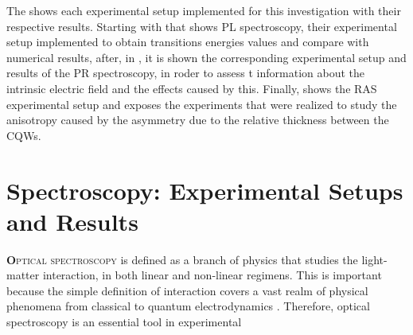 The  shows each experimental setup implemented for this investigation with
their respective results. Starting with   that shows \gls{PL} spectroscopy, their
experimental setup implemented to obtain transitions energies values and compare with
numerical results, after, in , it is shown the corresponding experimental setup and results of the \gls{PR} spectroscopy, in roder to assess t information about the intrinsic electric field and the effects caused by this. Finally,  shows the \gls{RAS} experimental setup and exposes the experiments
that were realized to study the anisotropy caused by the asymmetry due to the relative thickness between the \gls{CQWs}.

\section{Spectroscopy: Experimental Setups and Results}
\label{sec:chapter 3 Spectroscopy}
\vspace{-10mm} 
\lettrine[lines=3, lraise=.1, nindent=0mm, slope=0mm]{\textbf{O}}{ptical spectroscopy}
is defined as a branch of physics that studies the light-matter interaction, in both linear and non-linear regimens. This is important because the simple definition of interaction covers a vast realm of physical phenomena from classical to quantum electrodynamics \cite{weiner2017light}. Therefore, optical spectroscopy is an essential tool in experimental

